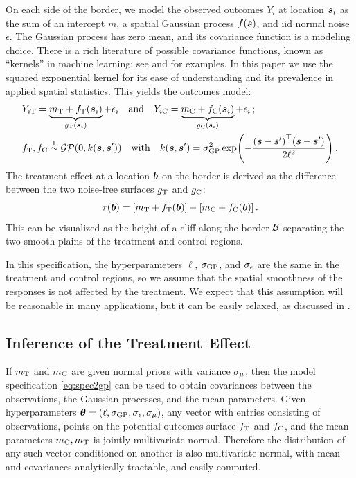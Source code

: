 \documentclass[12pt]{article}
\begin{document}
On each side of the border, we model the observed outcomes \(Y_i\) at location \(\bm{s}_i\) as the sum of an intercept \(m\), a spatial Gaussian process \(f(\bm{s})\), and iid normal noise \(\epsilon\).
The Gaussian process has zero mean, and its covariance function is a modeling choice.
There is a rich literature of possible covariance functions, known as ``kernels'' in machine learning; see
\cite{banerjee2014hierarchical} and \cite{rasmussen2006gaussian} for examples.
In this paper we use the squared exponential kernel for its ease of understanding and its prevalence in applied spatial statistics.
This yields the outcomes model:
\begin{equation}
    \begin{split}
        & Y_{i\treat} = \underbrace{m_\treat{} + f_\treat{}(\svec_i)}_{g_\treat{}(\svec_i)} + \epsilon_i \quad\text{and}\quad
        Y_{i\ctrol} = \underbrace{m_\ctrol{} + f_\ctrol{}(\svec_i)}_{g_\ctrol{}(\svec_i)} + \epsilon_i \,; \\
        & f_\treat{}, f_\ctrol{} \overset{\indep}{\sim} \GP\del{0, k(\svec, \svec')} \quad\text{with}\quad
        k(\svec,\svec') = \sigmaf^2 \exp\del{ - \frac{\del{\svec-\svec'}\trans\del{\svec-\svec'}}{2 \ell^2}} \,.
    \end{split}
    \label{eq:spec2gp}
\end{equation}
The treatment effect at a location \(\bm{b}\) on the border is derived as the difference between the two noise-free surfaces \(g_{\mathrm{T}}{}\) and \(g_{\mathrm{C}}{}\):
\begin{equation}
    \tau(\sentinel) = \sbr{m_\treat{} + f_\treat{}(\sentinel)} - \sbr{m_\ctrol{} + f_\ctrol{}(\sentinel)}\,.
\end{equation}
This can be visualized as the height of a cliff along the border \(\mathcal{B}\) separating the two smooth plains of the treatment and control regions.

In this specification, the hyperparameters \(\ell\), \(\sigma_{\mathrm{GP}}\), and \(\sigma_{\epsilon}\) are the same in the treatment and control regions, so we assume that the spatial smoothness of the responses is not affected by the treatment.
We expect that this assumption will be reasonable in many applications, but it can be easily relaxed, as discussed in \cite{Branson:2017qy}.



\subsection{Inference of the Treatment Effect}
\label{sec:inference}
If \(m_{\mathrm{T}}\) and \(m_{\mathrm{C}}\) are given normal priors with variance \(\sigma_{\mu}\), then the model specification \autoref{eq:spec2gp} can be used to obtain covariances between the observations, the Gaussian processes, and the mean parameters.
Given hyperparameters \(\bm{\theta} = \left\lparen\ell,\sigma_{\mathrm{GP}}, \sigma_{\epsilon}, \sigma_{\mu}\right\rparen\), any vector with entries consisting of observations, points on the potential outcomes surface \(f_{\mathrm{T}}\) and \(f_{\mathrm{C}}\), and the mean parameters \(m_{\mathrm{C}}, m_{\mathrm{T}}\) is jointly multivariate normal. Therefore the distribution of any such vector conditioned on another is also multivariate normal, with mean and covariances analytically tractable, and easily computed.
\end{document}

